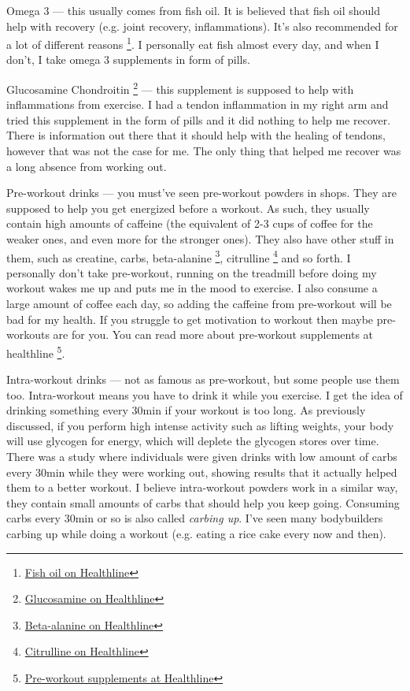 \documentclass[openany, 12pt]{book}
\begin{document}
        Omega 3 --- this usually comes from fish oil. It is believed that fish oil should help with recovery (e.g. joint recovery, inflammations). It's also recommended for a lot of different reasons
        \footnote{\href{https://www.healthline.com/nutrition/fish-oil-bodybuilding}{Fish oil on Healthline}}. I personally eat fish almost every day, and when I don't, I take
        omega 3 supplements in form of pills.

        Glucosamine Chondroitin
        \footnote{\href{https://www.healthline.com/nutrition/glucosamine}{Glucosamine on Healthline}} --- this supplement is supposed to help with inflammations from exercise.
        I had a tendon inflammation in my right arm and tried this supplement in the form of pills and it did nothing to help me recover. There is information out there that it should help with
        the healing of tendons, however that was not the case for me. The only thing that helped me recover was a long absence from working out.

        Pre-workout drinks --- you must've seen pre-workout powders in shops. They are supposed to help you get energized before a workout. As such, they usually contain high amounts of caffeine
        (the equivalent of 2-3 cups of coffee for the weaker ones, and even more for the stronger ones). They also have other stuff in them, such as creatine, carbs, beta-alanine
        \footnote{\href{https://www.healthline.com/nutrition/beta-alanine-101}{Beta-alanine on Healthline}}, citrulline
        \footnote{\href{https://www.healthline.com/nutrition/citrulline-supplements}{Citrulline on Healthline}} and so forth. I personally don't take pre-workout, running on the treadmill
        before doing my workout wakes me up and puts me in the mood to exercise. I also consume a large amount of coffee each day, so adding the caffeine from pre-workout will be bad for my health.
        If you struggle to get motivation to workout then maybe pre-workouts are for you. You can read more about pre-workout supplements at healthline
        \footnote{\href{https://www.healthline.com/nutrition/best-pre-workout-supplements}{Pre-workout supplements at Healthline}}.

        Intra-workout drinks --- not as famous as pre-workout, but some people use them too. Intra-workout means you have to drink it while you exercise. I get the idea of drinking something every 30min
        if your workout is too long. As previously discussed, if you perform high intense activity such as lifting weights, your body will use glycogen for energy, which will deplete the glycogen stores
        over time. There was a study where individuals were given drinks with low amount of carbs every 30min while they were working out, showing results that it actually helped them to a better
        workout. I believe intra-workout powders work in a similar way, they contain small amounts of carbs that should help you keep going. Consuming carbs every 30min or so is also
        called \textit{carbing up}. I've seen many bodybuilders carbing up while doing a workout (e.g. eating a rice cake every now and then).
\end{document}
